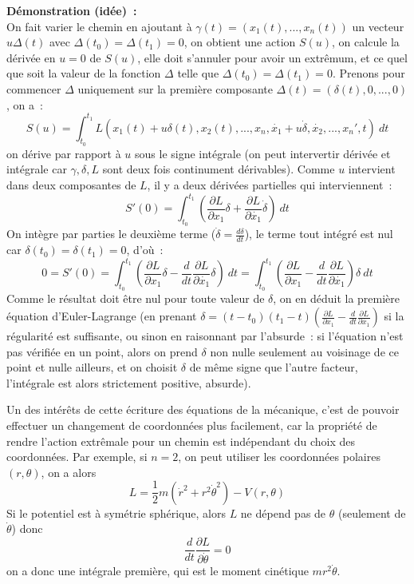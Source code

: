 \documentclass[a4paper,11pt]{article}
\begin{document}
{\bf D\'emonstration (id\'ee)~:}\\
On fait varier le chemin en ajoutant \`a 
$\gamma(t)=(x_1(t),...,x_n(t))$
un vecteur $u \Delta(t)$ avec $\Delta(t_0)=\Delta(t_1)=0$, on obtient
une action $S(u)$, on calcule la d\'eriv\'ee en $u=0$
de $S(u)$, elle doit s'annuler pour avoir un extr\^emum, et
ce quel que soit la valeur de la fonction $\Delta$ 
telle que $\Delta(t_0)=\Delta(t_1)=0$. Prenons pour commencer $\Delta$
uniquement sur la premi\`ere composante
$\Delta(t)=(\delta(t),0,...,0)$, on a~:
$$ S(u) = \int_{t_0}^{t_1}
L(x_1(t)+u\delta(t),x_2(t),...,x_n,\dot{x_1}+u\dot{\delta},\dot{x_2},...,x_n',t)  \ dt$$
on d\'erive par rapport \`a $u$ sous le signe int\'egrale (on peut
intervertir d\'eriv\'ee et int\'egrale car $\gamma, \delta, L$ sont
deux fois continument d\'erivables). Comme $u$ intervient dans deux
composantes de $L$, il y a deux d\'eriv\'ees partielles qui
interviennent~:
$$ S'(0) =\int_{t_0}^{t_1} \left(\frac{\partial L}{\partial x_1} \delta + 
\frac{\partial L}{\partial \dot{x_1}} \dot{\delta} \right) \ dt$$
On int\`egre par parties le deuxi\`eme terme ($\dot{\delta}=\frac{d
  \delta}{dt}$), le terme tout int\'egr\'e est nul 
car $\delta(t_0)=\delta(t_1)=0$, d'o\`u~:
$$ 0=S'(0)=\int_{t_0}^{t_1} \left( \frac{\partial L}{\partial x_1} \delta 
-\frac{d}{dt} \frac{\partial L}{\partial \dot{x_1}} \delta \right) \
dt
=\int_{t_0}^{t_1} \left( \frac{\partial L}{\partial x_1} 
-\frac{d}{dt} \frac{\partial L}{\partial \dot{x_1}} \right) \delta \
dt$$
Comme le r\'esultat doit \^etre nul
pour toute valeur de $\delta$, on en d\'eduit la premi\`ere
\'equation d'Euler-Lagrange (en prenant
$\delta=(t-t_0)(t_1-t) (\frac{\partial L}{\partial x_1} 
-\frac{d}{dt} \frac{\partial L}{\partial \dot{x_1}})$ si la r\'egularit\'e
est suffisante, ou sinon en raisonnant par l'absurde~:
si l'\'equation n'est pas v\'erifi\'ee
en un point, alors on prend $\delta$ non nulle seulement
au voisinage de ce point et nulle ailleurs, et on choisit $\delta$
de m\^eme signe que l'autre facteur, l'int\'egrale est alors
strictement positive, absurde).

Un des int\'er\^ets de cette \'ecriture des \'equations de la
m\'ecanique, c'est de pouvoir effectuer un changement de coordonn\'ees
plus facilement, car la propri\'et\'e de rendre l'action extr\^emale pour un
chemin est ind\'ependant du choix des coordonn\'ees.
Par exemple, si $n=2$, on peut utiliser les coordonn\'ees polaires 
$(r,\theta)$, on a alors
$$ L=\frac12m(\dot{r}^2+r^2 \dot{\theta}^2) - V(r,\theta)$$
Si le potentiel est \`a sym\'etrie sph\'erique, alors $L$ ne
d\'epend pas de $\theta$ (seulement de $\dot{\theta}$) donc
$$ \frac{d}{dt} \frac{\partial L}{\partial \dot{\theta}} = 0$$
on a donc une int\'egrale premi\`ere, qui est le moment cin\'etique
$mr^2 \dot{\theta}$.
\end{document}
